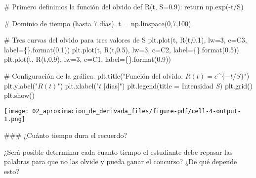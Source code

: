 \documentclass[
  letterpaper,
  DIV=11,
  numbers=noendperiod]{scrreprt}
\newenvironment{Shaded}{\begin{snugshade}}{\end{snugshade}}
\newcommand{\BuiltInTok}[1]{\textcolor[rgb]{0.00,0.23,0.31}{#1}}
\newcommand{\CommentTok}[1]{\textcolor[rgb]{0.37,0.37,0.37}{#1}}
\newcommand{\ControlFlowTok}[1]{\textcolor[rgb]{0.00,0.23,0.31}{#1}}
\newcommand{\DecValTok}[1]{\textcolor[rgb]{0.68,0.00,0.00}{#1}}
\newcommand{\FloatTok}[1]{\textcolor[rgb]{0.68,0.00,0.00}{#1}}
\newcommand{\KeywordTok}[1]{\textcolor[rgb]{0.00,0.23,0.31}{#1}}
\newcommand{\NormalTok}[1]{\textcolor[rgb]{0.00,0.23,0.31}{#1}}
\newcommand{\OperatorTok}[1]{\textcolor[rgb]{0.37,0.37,0.37}{#1}}
\newcommand{\SpecialCharTok}[1]{\textcolor[rgb]{0.37,0.37,0.37}{#1}}
\newcommand{\StringTok}[1]{\textcolor[rgb]{0.13,0.47,0.30}{#1}}
\begin{document}
\begin{Shaded}
\begin{Highlighting}[]
\CommentTok{\# Primero definimos la función del olvido}
\KeywordTok{def}\NormalTok{ R(t, S}\OperatorTok{=}\FloatTok{0.9}\NormalTok{):}
    \ControlFlowTok{return}\NormalTok{ np.exp(}\OperatorTok{{-}}\NormalTok{t}\OperatorTok{/}\NormalTok{S)}

\CommentTok{\# Dominio de tiempo (hasta 7 días).}
\NormalTok{t }\OperatorTok{=}\NormalTok{ np.linspace(}\DecValTok{0}\NormalTok{,}\DecValTok{7}\NormalTok{,}\DecValTok{100}\NormalTok{)}

\CommentTok{\# Tres curvas del olvido para tres valores de S}
\NormalTok{plt.plot(t, R(t,}\FloatTok{0.1}\NormalTok{), lw}\OperatorTok{=}\DecValTok{3}\NormalTok{, c}\OperatorTok{=}\StringTok{\textquotesingle{}C3\textquotesingle{}}\NormalTok{, label}\OperatorTok{=}\StringTok{\textquotesingle{}}\SpecialCharTok{\{\}}\StringTok{\textquotesingle{}}\NormalTok{.}\BuiltInTok{format}\NormalTok{(}\FloatTok{0.1}\NormalTok{))}
\NormalTok{plt.plot(t, R(t,}\FloatTok{0.5}\NormalTok{), lw}\OperatorTok{=}\DecValTok{3}\NormalTok{, c}\OperatorTok{=}\StringTok{\textquotesingle{}C2\textquotesingle{}}\NormalTok{, label}\OperatorTok{=}\StringTok{\textquotesingle{}}\SpecialCharTok{\{\}}\StringTok{\textquotesingle{}}\NormalTok{.}\BuiltInTok{format}\NormalTok{(}\FloatTok{0.5}\NormalTok{))}
\NormalTok{plt.plot(t, R(t,}\FloatTok{0.9}\NormalTok{), lw}\OperatorTok{=}\DecValTok{3}\NormalTok{, c}\OperatorTok{=}\StringTok{\textquotesingle{}C1\textquotesingle{}}\NormalTok{, label}\OperatorTok{=}\StringTok{\textquotesingle{}}\SpecialCharTok{\{\}}\StringTok{\textquotesingle{}}\NormalTok{.}\BuiltInTok{format}\NormalTok{(}\FloatTok{0.9}\NormalTok{))}

\CommentTok{\# Configuración de la gráfica. }
\NormalTok{plt.title(}\StringTok{"Función del olvido: $R(t)=e\^{}\{{-}t/S\}$"}\NormalTok{)}
\NormalTok{plt.ylabel(}\StringTok{"$R(t)$"}\NormalTok{)}
\NormalTok{plt.xlabel(}\StringTok{"$t$ [días]"}\NormalTok{)}
\NormalTok{plt.legend(title }\OperatorTok{=} \StringTok{\textquotesingle{}Intensidad $S$\textquotesingle{}}\NormalTok{)}
\NormalTok{plt.grid()}
\NormalTok{plt.show()}
\end{Highlighting}
\end{Shaded}

\texttt{[image: 02\_aproximacion\_de\_derivada\_files/figure-pdf/cell-4-output-1.png]}

\#\#\# ¿Cuánto tiempo dura el recuerdo?

¿Será posible determinar cada cuanto tiempo el estudiante debe repasar
las palabras para que no las olvide y pueda ganar el concurso? ¿De qué
depende esto?
\end{document}
